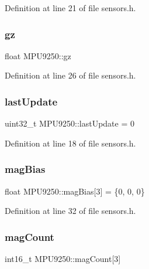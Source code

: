 Definition at line 21 of file sensors.\+h.

\mbox{\label{classMPU9250_a756658ca06a3807ef426ab87022a15c9}} 
\subsubsection{\texorpdfstring{gz}{gz}}
{\footnotesize\ttfamily float M\+P\+U9250\+::gz}



Definition at line 26 of file sensors.\+h.

\mbox{\label{classMPU9250_af60ee039dadb9eb5f4ade404ddfd878b}} 
\subsubsection{\texorpdfstring{last\+Update}{lastUpdate}}
{\footnotesize\ttfamily uint32\+\_\+t M\+P\+U9250\+::last\+Update = 0}



Definition at line 18 of file sensors.\+h.

\mbox{\label{classMPU9250_a1f3b364d6efca22837dd944c60effce5}} 
\subsubsection{\texorpdfstring{mag\+Bias}{magBias}}
{\footnotesize\ttfamily float M\+P\+U9250\+::mag\+Bias\mbox{[}3\mbox{]} = \{0, 0, 0\}}



Definition at line 32 of file sensors.\+h.

\mbox{\label{classMPU9250_aff92db5334c43a72f5c2f1fc8ee6f596}} 
\subsubsection{\texorpdfstring{mag\+Count}{magCount}}
{\footnotesize\ttfamily int16\+\_\+t M\+P\+U9250\+::mag\+Count\mbox{[}3\mbox{]}}



